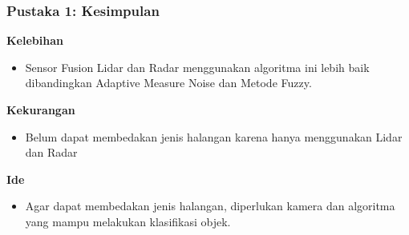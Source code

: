 \begin{frame}
    \frametitle{Pustaka 1: Kesimpulan}

    \large
    \textbf{Kelebihan}\\
    \normalsize
    \begin{itemize}
        \item Sensor Fusion Lidar dan Radar menggunakan algoritma ini lebih baik dibandingkan Adaptive Measure Noise dan Metode Fuzzy.
    \end{itemize}

    \large
    \textbf{Kekurangan}\\
    \normalsize
    \begin{itemize}
        \item Belum dapat membedakan jenis halangan karena hanya menggunakan Lidar dan Radar
    \end{itemize}

    \large
    \textbf{Ide}\\
    \normalsize
    \begin{itemize}
        \item Agar dapat membedakan jenis halangan, diperlukan kamera dan algoritma yang mampu melakukan klasifikasi objek.
    \end{itemize}

\end{frame}
